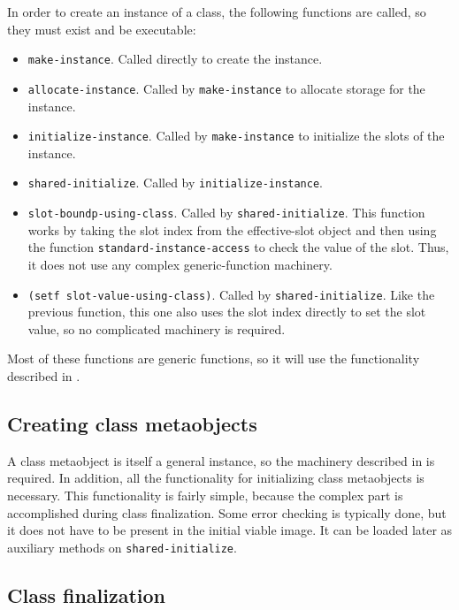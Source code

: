In order to create an instance of a class, the following functions
are called, so they must exist and be executable:

\begin{itemize}
\item \texttt{make-instance}.  Called directly to create the instance.
\item \texttt{allocate-instance}.  Called by \texttt{make-instance} to
  allocate storage for the instance.
\item \texttt{initialize-instance}.  Called by \texttt{make-instance}
  to initialize the slots of the instance.
\item \texttt{shared-initialize}.  Called by
  \texttt{initialize-instance}.
\item \texttt{slot-boundp-using-class}.  Called by
  \texttt{shared-initialize}.  This function works by taking the slot
  index from the effective-slot object and then using the function
  \texttt{standard-instance-access} to check the value of the slot.
  Thus, it does not use any complex generic-function machinery.
\item \texttt{(setf slot-value-using-class)}.  Called by
  \texttt{shared-initialize}.  Like the previous function, this one
  also uses the slot index directly to set the slot value, so no
  complicated machinery is required.
\end{itemize}

Most of these functions are generic functions, so it will use the
functionality described in
.


\subsection{Creating class metaobjects}

A class metaobject is itself a general instance, so the machinery
described in  is
required.  In addition, all the functionality for initializing class
metaobjects is necessary.  This functionality is fairly simple,
because the complex part is accomplished during class finalization.
Some error checking is typically done, but it does not have to be
present in the initial viable image.  It can be loaded later as
auxiliary methods on \texttt{shared-initialize}.

\subsection{Class finalization}

